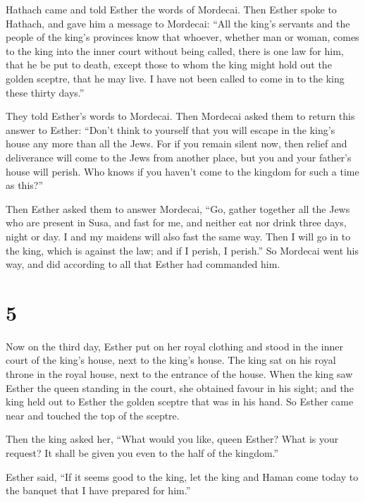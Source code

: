  Hathach came and told Esther the words of Mordecai.
 Then Esther spoke to Hathach, and gave him a message to
Mordecai:  ``All the king's servants and the people of
the king's provinces know that whoever, whether man or woman, comes to
the king into the inner court without being called, there is one law for
him, that he be put to death, except those to whom the king might hold
out the golden sceptre, that he may live. I have not been called to come
in to the king these thirty days.''

 They told Esther's words to Mordecai. 
Then Mordecai asked them to return this answer to Esther: ``Don't think
to yourself that you will escape in the king's house any more than all
the Jews.  For if you remain silent now, then relief and
deliverance will come to the Jews from another place, but you and your
father's house will perish. Who knows if you haven't come to the kingdom
for such a time as this?''

 Then Esther asked them to answer Mordecai,
 ``Go, gather together all the Jews who are present in
Susa, and fast for me, and neither eat nor drink three days, night or
day. I and my maidens will also fast the same way. Then I will go in to
the king, which is against the law; and if I perish, I perish.''
 So Mordecai went his way, and did according to all that
Esther had commanded him.

\hypertarget{section-4}{%
\section{5}\label{section-4}}

 Now on the third day, Esther put on her royal clothing
and stood in the inner court of the king's house, next to the king's
house. The king sat on his royal throne in the royal house, next to the
entrance of the house.  When the king saw Esther the queen
standing in the court, she obtained favour in his sight; and the king
held out to Esther the golden sceptre that was in his hand. So Esther
came near and touched the top of the sceptre.

 Then the king asked her, ``What would you like, queen
Esther? What is your request? It shall be given you even to the half of
the kingdom.''

 Esther said, ``If it seems good to the king, let the king
and Haman come today to the banquet that I have prepared for him.''

